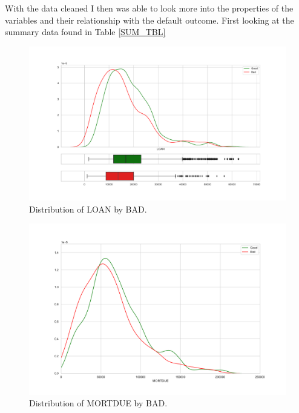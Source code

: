 With the data cleaned I then was able to look more into the properties of the variables and their relationship with the default outcome. First looking at the summary data found in Table
 \ref{SUM_TBL}

\begin{figure}[!ht]
	\centering
	\includegraphics[scale=0.40]{figs/loan_dist.pdf}
	\caption{Distribution of LOAN by BAD. \label{loan_dist}}
\end{figure}

\begin{figure}[!ht]
	\centering
	\includegraphics[scale=0.40]{figs/mortdue_dist.pdf}
	\caption{Distribution of MORTDUE by BAD. \label{mortdue_dist}}
\end{figure}

